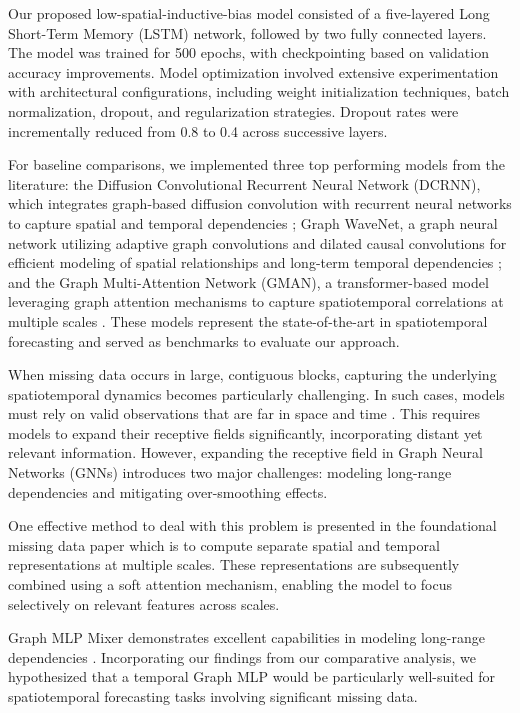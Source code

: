 \documentclass{article}
\theoremstyle{plain}
\theoremstyle{definition}
\theoremstyle{remark}
\begin{document}
Our proposed low-spatial-inductive-bias model consisted of a five-layered Long Short-Term Memory (LSTM) network, followed by two fully connected layers. The model was trained for 500 epochs, with checkpointing based on validation accuracy improvements.  Model optimization involved extensive experimentation with architectural configurations, including weight initialization techniques, batch normalization, dropout, and regularization strategies. Dropout rates were incrementally reduced from 0.8 to 0.4 across successive layers.

For baseline comparisons, we implemented three top performing models from the literature: the Diffusion Convolutional Recurrent Neural Network (DCRNN), which integrates graph-based diffusion convolution with recurrent neural networks to capture spatial and temporal dependencies \cite{li2017diffusion}; Graph WaveNet, a graph neural network utilizing adaptive graph convolutions and dilated causal convolutions for efficient modeling of spatial relationships and long-term temporal dependencies \cite{waveNet2019graph}; and the Graph Multi-Attention Network (GMAN), a transformer-based model leveraging graph attention mechanisms to capture spatiotemporal correlations at multiple scales \cite{zheng2020gman}. These models represent the state-of-the-art in spatiotemporal forecasting and served as benchmarks to evaluate our approach.

When missing data occurs in large, contiguous blocks, capturing the underlying spatiotemporal dynamics becomes particularly challenging. In such cases, models must rely on valid observations that are far in space and time \cite{marisca2024graph}. This requires models to expand their receptive fields significantly, incorporating distant yet relevant information. However, expanding the receptive field in Graph Neural Networks (GNNs) introduces two major challenges: modeling long-range dependencies and mitigating over-smoothing effects.

One effective method to deal with this problem is presented in the foundational missing data paper \cite{marisca2024graph} which is to compute separate spatial and temporal representations at multiple scales. These representations are subsequently combined using a soft attention mechanism, enabling the model to focus selectively on relevant features across scales.

Graph MLP Mixer demonstrates excellent capabilities in modeling long-range dependencies \cite{he2023generalization}. Incorporating our findings from our comparative analysis, we hypothesized that a temporal Graph MLP would be particularly well-suited for spatiotemporal forecasting tasks involving significant missing data. 
\end{document}
